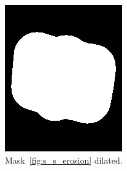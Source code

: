 \documentclass{article}
\begin{document}
\begin{figure}
\begin{subfigure}{0.3\textwidth}
    \includegraphics[width=\linewidth]{pictures/remove_knobs_expansion.png}
    \caption{Mask~\cref{fig:s_s_erosion} dilated.}
    \label{fig:s_s_dilatation}
  \end{subfigure}
  \vspace{1cm}
  \begin{subfigure}{0.3\textwidth}
    \centering

\end{subfigure}
\end{figure}
\end{document}
